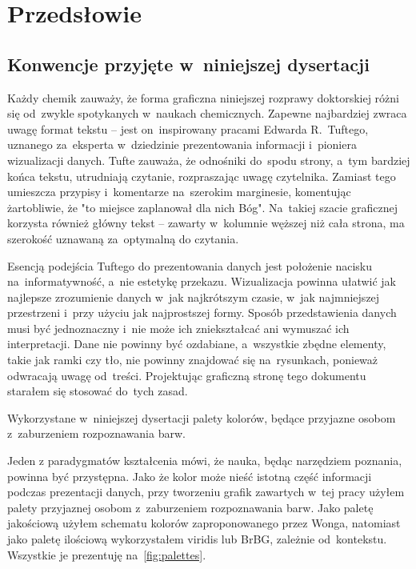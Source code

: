 \chapter{Przedsłowie}\label{chapter:intro}

\section{Konwencje przyjęte w~niniejszej dysertacji}\label{intro:conventions}

Każdy chemik zauważy, że forma graficzna niniejszej rozprawy doktorskiej różni się
  od~zwykle spotykanych w~naukach chemicznych.
Zapewne najbardziej zwraca uwagę format tekstu \--- 
  jest on~inspirowany pracami Edwarda R.~Tuftego,
  uznanego za~eksperta w~dziedzinie prezentowania informacji i~pioniera wizualizacji
  danych.
Tufte zauważa, że odnośniki do~spodu strony, a~tym bardziej końca tekstu,
  utrudniają czytanie, rozpraszając uwagę czytelnika.
Zamiast tego umieszcza przypisy i~komentarze na~szerokim marginesie,
  komentując żartobliwie, że "to miejsce zaplanował dla nich Bóg".
Na~takiej szacie graficznej korzysta również główny tekst \---
  zawarty w~kolumnie węższej niż cała strona, ma szerokość uznawaną za~optymalną
  do czytania.

Esencją podejścia Tuftego do prezentowania danych jest położenie nacisku
  na~informatywność, a~nie estetykę przekazu.
Wizualizacja powinna ułatwić jak najlepsze zrozumienie danych w~jak najkrótszym czasie,
  w~jak najmniejszej przestrzeni i~przy użyciu jak najprostszej formy.
Sposób przedstawienia danych musi być jednoznaczny i~nie może ich zniekształcać
  ani wymuszać ich interpretacji.
Dane nie powinny być ozdabiane, a~wszystkie zbędne elementy, takie jak ramki czy tło,
  nie powinny znajdować się na~rysunkach, ponieważ odwracają uwagę od~treści.
Projektując graficzną stronę tego dokumentu starałem się stosować do~tych zasad.

\begin{marginfigure}
  
  \caption{
    Wykorzystane w~niniejszej dysertacji palety kolorów,
    będące przyjazne osobom z~zaburzeniem rozpoznawania barw.
  }
  \label{fig:palettes}
\end{marginfigure}
Jeden z paradygmatów kształcenia mówi, że nauka, będąc narzędziem poznania,
  powinna być przystępna.
Jako że kolor może nieść istotną część informacji podczas prezentacji danych,
  przy tworzeniu grafik zawartych w~tej pracy użyłem palety przyjaznej osobom
  z~zaburzeniem rozpoznawania barw.
Jako paletę jakościową użyłem schematu kolorów zaproponowanego przez Wonga,
  natomiast jako paletę ilościową wykorzystałem viridis lub BrBG,
  zależnie od~kontekstu.
Wszystkie je prezentuję na~\cref{fig:palettes}.

